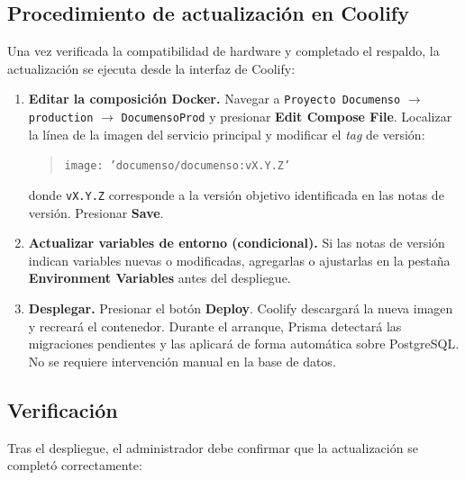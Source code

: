 \subsection{Procedimiento de actualización en Coolify}

Una vez verificada la compatibilidad de hardware y completado el respaldo, la actualización se ejecuta desde la interfaz de Coolify:

\begin{enumerate}
    \item \begin{sloppypar}\textbf{Editar la composición Docker.} Navegar a \texttt{Proyecto Documenso} $\rightarrow$ \texttt{production} $\rightarrow$ \texttt{DocumensoProd} y presionar \textbf{Edit Compose File}. Localizar la línea de la imagen del servicio principal y modificar el \textit{tag} de versión:\end{sloppypar}

    \begin{quote}
    \texttt{image: 'documenso/documenso:vX.Y.Z'}
    \end{quote}

    donde \texttt{vX.Y.Z} corresponde a la versión objetivo identificada en las notas de versión. Presionar \textbf{Save}.

    \item \textbf{Actualizar variables de entorno (condicional).} Si las notas de versión indican variables nuevas o modificadas, agregarlas o ajustarlas en la pestaña \textbf{Environment Variables} antes del despliegue.

    \item \textbf{Desplegar.} Presionar el botón \textbf{Deploy}. Coolify descargará la nueva imagen y recreará el contenedor. Durante el arranque, Prisma detectará las migraciones pendientes y las aplicará de forma automática sobre PostgreSQL. No se requiere intervención manual en la base de datos.
\end{enumerate}

\subsection{Verificación}

Tras el despliegue, el administrador debe confirmar que la actualización se completó correctamente:

